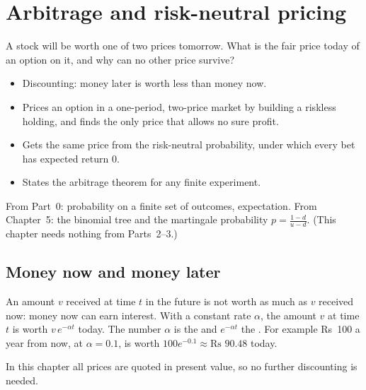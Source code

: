\chapter{Arbitrage and risk-neutral pricing}
\label{ch:arbitrage}

\begin{question}
A stock will be worth one of two prices tomorrow. What is the fair price today of an option on it, and why can no other price survive?
\end{question}

\begin{whatfor}
\begin{itemize}
  \item Discounting: money later is worth less than money now.
  \item Prices an option in a one-period, two-price market by building a riskless holding, and finds the only price that allows no sure profit.
  \item Gets the same price from the risk-neutral probability, under which every bet has expected return $0$.
  \item States the arbitrage theorem for any finite experiment.
\end{itemize}
\end{whatfor}

\begin{prereq}
From Part~0: probability on a finite set of outcomes, expectation. From Chapter~5: the binomial tree and the martingale probability $p=\frac{1-d}{u-d}$. (This chapter needs nothing from Parts~2--3.)
\end{prereq}

\section{Money now and money later}

An amount $v$ received at time $t$ in the future is not worth as much as $v$ received now: money now can earn interest. With a constant rate $\alpha$, the amount $v$ at time $t$ is worth $v\,e^{-\alpha t}$ today. The number $\alpha$ is the  and $e^{-\alpha t}$ the . For example Rs~100 a year from now, at $\alpha=0.1$, is worth $100e^{-0.1}\approx\text{Rs }90.48$ today.

In this chapter all prices are quoted in present value, so no further discounting is needed.

